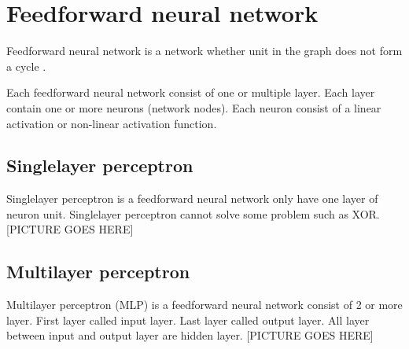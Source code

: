 \section{Feedforward neural network}
Feedforward neural network is a network whether unit in the graph does not form a cycle \cite{Goodfelloetal2016}. 

Each feedforward neural network consist of one or multiple layer. Each layer contain one or more neurons (network nodes). Each neuron consist of a linear activation or non-linear activation function. 

\subsection{Singlelayer perceptron}
Singlelayer perceptron is a feedforward neural network only have one layer of neuron unit.  Singlelayer perceptron cannot solve some problem such as XOR.
[PICTURE GOES HERE]


\subsection{Multilayer perceptron}
Multilayer perceptron (MLP) is a feedforward neural network consist of 2 or more layer. First layer called input layer. Last layer called output layer. All layer between input and output layer are hidden layer.
[PICTURE GOES HERE]
